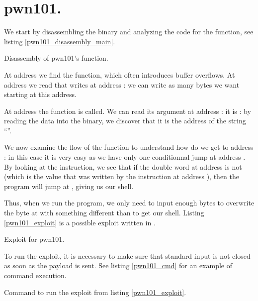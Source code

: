 \section{pwn101.}
\par We start by disassembling the binary and analyzing the code for the  function, see listing \ref{pwn101_disassembly_main}.
\begin{listing}
	
	\caption{Disassembly of pwn101's  function.}
	\label{pwn101_disassembly_main}
\end{listing}
\par At address  we find the  function, which often introduces buffer overflows. At address  we read that  writes at address : we can write as many bytes we want starting at this address.
\par At address  the function  is called. We can read its argument at address : it is : by reading the data into the binary, we discover that it is the address of the string ``''.
\par We now examine the flow of the  function to understand how do we get to address :  in this case it is very easy as we have only one conditionnal jump at address . By looking at the  instruction, we see that if the double word at address  is not  (which is the value that was written by the instruction at address ), then the program will jump at , giving us our shell.
\par Thus, when we run the program, we only need to input enough bytes to overwrite the byte at  with something different than  to get our shell. Listing \ref{pwn101_exploit} is a possible exploit written in .
\begin{listing}
	\caption{Exploit for pwn101.}
	\label{pwn101_exploit}
\end{listing}
\par To run the exploit, it is necessary to make sure that standard input is not closed as soon as the payload is sent. See listing \ref{pwn101_cmd} for an example of command execution.
\begin{listing}
	\caption{Command to run the exploit from listing \ref{pwn101_exploit}.}
	\label{pwn101_cmd}
\end{listing}
